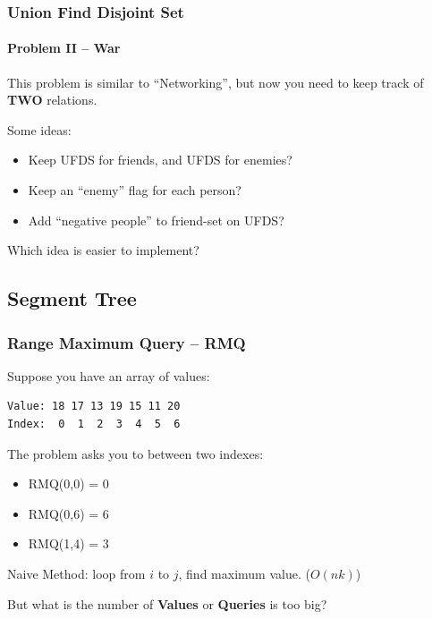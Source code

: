 \begin{frame}
  \frametitle{Union Find Disjoint Set}
  \framesubtitle{Problem II -- War}

  This problem is similar to ``Networking'', but now you need to keep
  track of {\bf TWO} relations.

  \bigskip

  Some ideas:
  \begin{itemize}
  \item Keep UFDS for friends, and UFDS for enemies?
  \item Keep an ``enemy'' flag for each person?
  \item Add ``negative people'' to friend-set on UFDS?
  \end{itemize}

  \bigskip

  Which idea is easier to implement?
\end{frame}

\subsection{Segment Tree}
\begin{frame}[fragile]
  \frametitle{Range Maximum Query -- RMQ}

  Suppose you have an array of values:
\begin{verbatim}
Value: 18 17 13 19 15 11 20
Index:  0  1  2  3  4  5  6
\end{verbatim}

\bigskip

The  problem asks you to  between two indexes:

\begin{itemize}
  \item RMQ(0,0) = 0
  \item RMQ(0,6) = 6
  \item RMQ(1,4) = 3
\end{itemize}

\bigskip

\alert{Naive Method:} loop from $i$ to $j$, find maximum value. ($O(nk)$)\\
\medskip

But what is the number of {\bf Values} or {\bf Queries} is too big?
\end{frame}

